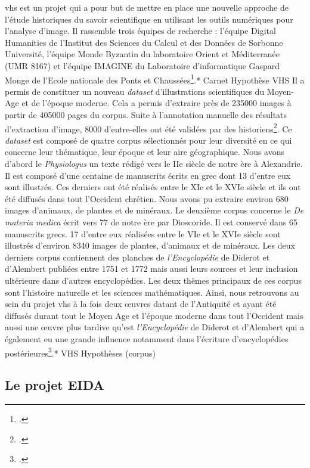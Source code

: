 \gls{vhs} est un projet qui a pour but de mettre en place une nouvelle approche de l'étude historiques du savoir scientifique en utilisant les outils numériques pour l'analyse d'image. Il rassemble trois équipes de recherche : l'équipe Digital Humanities de l'Institut des Sciences du Calcul et des Données de Sorbonne Université, l'équipe Monde Byzantin du laboratoire Orient et Méditerranée (UMR 8167) et l'équipe IMAGINE du Laboratoire d'informatique Gaspard Monge de l'Ecole nationale des Ponts et Chaussées\footcite{Presentation}.* Carnet Hypothèse VHS Il a permis de constituer un nouveau \textit{dataset} d'illustrations scientifiques du Moyen-Age et de l'époque moderne. Cela a permis d'extraire près de 235000 images à partir de 405000 pages du corpus. Suite à l'annotation manuelle des résultats d'extraction d'image, 8000 d'entre-elles ont été validées par des historiens\footcite{fouadComputerVisionHistorical2023}. Ce \textit{dataset} est composé de quatre corpus sélectionnés pour leur diversité en ce qui concerne leur thématique, leur époque et leur aire géographique. 
Nous avons d'abord le \textit{Physiologus} un texte rédigé vers le IIe siècle de notre ère à Alexandrie. Il est composé d'une centaine de manuscrits écrits en grec dont 13 d'entre eux sont illustrés. Ces derniers ont été réalisés entre le XIe et le XVIe siècle et ils ont été diffusés dans tout l'Occident chrétien. Nous avons pu extraire environ 680 images d'animaux, de plantes et de minéraux. 
Le deuxième corpus concerne le \textit{De materia medica} écrit vers 77 de notre ère par Dioscoride. Il est conservé dans 65 manuscrits grecs. 17 d'entre eux réalisées entre le VIe et le XVIe siècle sont illustrés d'environ 8340 images de plantes, d'animaux et de minéraux. 
Les deux derniers corpus contiennent des planches de \textit{l'Encyclopédie} de Diderot et d'Alembert publiées entre 1751 et 1772 mais aussi leurs sources et leur inclusion ultérieure dans d'autres encyclopédies. Les deux thèmes principaux de ces corpus sont l'histoire naturelle et les sciences mathématiques. 
Ainsi, nous retrouvons au sein du projet \gls{vhs} à la fois deux œuvres datant de l'Antiquité et ayant été diffusés durant tout le Moyen Age et l'époque moderne dans tout l'Occident mais aussi une œuvre plus tardive qu'est \textit{l'Encyclopédie} de Diderot et d'Alembert qui a également eu une grande influence notamment dans l'écriture d'encyclopédies postérieures\footcite{Corpus}.* VHS Hypothèses (corpus)



\subsection{Le projet EIDA}


